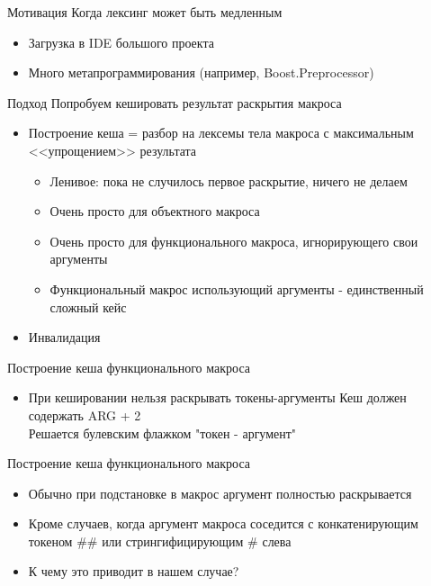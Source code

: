 \documentclass{beamer}
\begin{document}
\begin{frame}[t, fragile]{Мотивация}
Когда лексинг может быть медленным
\begin{itemize}[<+->]
\item Загрузка в IDE большого проекта
\item Много метапрограммирования (например, Boost.Preprocessor)


\lstRepeat

\end{itemize}
\end{frame}


\begin{frame}[t, fragile]{Подход}
Попробуем кешировать результат раскрытия макроса
\begin{itemize}[<+->]
\item Построение кеша = разбор на лексемы тела макроса с максимальным <<упрощением>> результата
\begin{itemize}
\item Ленивое: пока не случилось первое раскрытие, ничего не делаем
\item Очень просто для объектного макроса
\item Очень просто для функционального макроса, игнорирующего свои аргументы
\item Функциональный макрос использующий аргументы - единственный сложный кейс
\end{itemize}
\item Инвалидация
\end{itemize}

\end{frame}

\begin{frame}[t, fragile]{Построение кеша функционального макроса}
\begin{itemize}
\item При кешировании нельзя раскрывать токены-аргументы
\argCat
Кеш должен содержать ARG + 2\\
Решается булевским флажком "токен - аргумент"
\end{itemize}
\end{frame}

\begin{frame}[t, fragile]{Построение кеша функционального макроса}
\begin{itemize}[<+->]
\item Обычно при подстановке в макрос аргумент полностью раскрывается
\item Кроме случаев, когда аргумент макроса соседится с конкатенирующим токеном \#\# или стрингифицирующим \# слева
\item К чему это приводит в нашем случае?
\end{itemize}

\end{frame}
\end{document}
